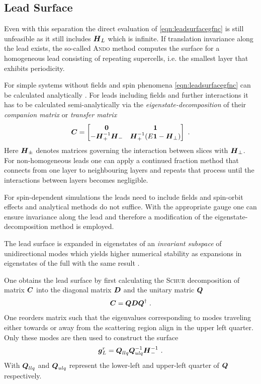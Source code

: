 \subsection{Lead Surface \cgfncs{}}
Even with this separation the direct evaluation of \cref{eqn:leadsurfacegfnc} is still unfeasible as it still includes $\boldsymbol{H}_L$ which is infinite.
If translation invariance along the lead exists, the so-called \textsc{Ando} method \cite{PhysRevB.44.8017} computes the surface \gfnc{} for a homogeneous lead consisting of repeating supercells, i.e. the smallest layer that exhibits periodicity.\par
For simple systems without fields and spin phenomena \cref{eqn:leadsurfacegfnc} can be calculated analytically \cite{Datta1997}. For leads including fields and further interactions it has to be calculated semi-analytically via the \emph{eigenstate-decomposition} of their \emph{companion matrix} \cite{PhysRevB.25.3975} or \emph{transfer matrix} \cite{PhysRevB.55.5266} \cite{PhysRevB.66.205319}
\begin{align}
  \boldsymbol{C} =
  \begin{bmatrix}
  \boldsymbol{0}  &\boldsymbol{1} \\
  -\boldsymbol{H}_{+}^{-1}\boldsymbol{H}_{-} &\boldsymbol{H}_{+}^{-1} (E\boldsymbol{1} - \boldsymbol{H}_{\perp})
  \end{bmatrix}\ .
  \label{eqn:companionmatrix}
\end{align}
Here $\boldsymbol{H}_{\pm}$ denotes matrices governing the interaction between slices with \hamil{} $\boldsymbol{H}_{\perp}$.
For non-homogeneous leads one can apply a continued fraction method \cite{Velev2004} that connects \gfncs{} from one layer to neighbouring layers and repeats that process until the interactions between layers becomes negligible.\par
For spin-dependent simulations the leads need to include fields and spin-orbit effects and analytical methods do not suffice. With the appropriate gauge one can ensure invariance along the lead and therefore a modification of the eigenstate-decomposition method is employed.\par
The lead surface \gfnc{} is expanded in eigenstates of an \emph{invariant subspace} of unidirectional modes which yields higher numerical stability as expansions in eigenstates of the full \hamil{} with the same result \cite{Wimmer2009JComPhys}.\par
One obtains the lead surface \gfnc{} by first calculating the \textsc{Schur} decomposition of matrix $\boldsymbol{C}$ into the diagonal matrix $\boldsymbol{D}$ and the unitary matric $\boldsymbol{Q}$
\begin{align}
\boldsymbol{C} = \boldsymbol{Q}\boldsymbol{D}\boldsymbol{Q}^{\dagger}\ .
\label{eqn:schurdecomposition}
\end{align}
One reorders matrix  such that the eigenvalues corresponding to modes traveling either towards or away from the scattering region align in the upper left quarter. Only these modes are then used to construct the surface \gfnc{}
\begin{align}
\boldsymbol{g}^r_L = \boldsymbol{Q}_{llq}\boldsymbol{Q}_{ulq}^{-1}\boldsymbol{H}_{-}^{-1}\ .
\end{align}
With $\boldsymbol{Q}_{llq}$ and $\boldsymbol{Q}_{ulq}$ represent the lower-left and upper-left quarter of $\boldsymbol{Q}$ respectively. 
